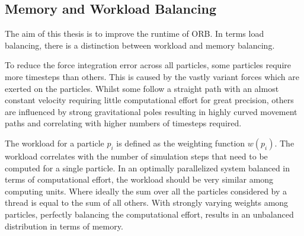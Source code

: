 \documentclass[]{article}
\begin{document}
\subsection{Memory and Workload Balancing}\label{balancing}
The aim of this thesis is to improve the runtime of ORB. In terms load balancing, there is a distinction between workload and memory balancing. 

To reduce the force integration error across all particles, some particles require more timesteps than others. This is caused by the vastly variant forces which are exerted on the particles. Whilst some follow a straight path with an almost constant velocity requiring little computational effort for great precision, others are influenced by strong gravitational poles resulting in highly curved movement paths and correlating with higher numbers of timesteps required.

The workload for a particle $p_i$ is defined as the weighting function $w(p_i)$. The workload correlates with the number of simulation steps that need to be computed for a single particle. In an optimally parallelized system balanced in terms of computational effort, the workload should be very similar among computing units. Where ideally the sum over all the particles considered by a thread is equal to the sum of all others. With strongly varying weights among particles, perfectly balancing the computational effort, results in an unbalanced distribution in terms of memory. 

\begin{comment}
Lets consider a simple example to illustrate the point. Given the set of particles $A = \{p_1, p_2, .., p_{2m/3}\}$ and respectively $B = \{p_{2m/3 + 1}, p_2, .., p_{m}\}$. This yields a total number of particles equivalent to $N = m$. Assuming that $\forall p \in A : w(p) = 1$ and $\forall p \in B : w(p) = 2$. 
All particles from set $A$ are assigned to processor rank 0 and the particles from B to rank 1. It follows $\sum_{p\in A} w(p) = \sum_{p\in B} w(p)$. Thus the two processors are balanced in terms of computing costs, but not in terms of memory size. In fact, process with rank 0 has $2m/3$ elements and rank 1 has $m/3$ elements. Assuming each process has a memory size of $2m/3$, then clearly this configuration is not optimal. When favoring memory balancing, $2m/3$ could be assigned to each processor and $(4/3) \times m$ as many particles could be processed in total, which is larger than the original $N$ and therefore favorable.
\end{comment}
\end{document}
